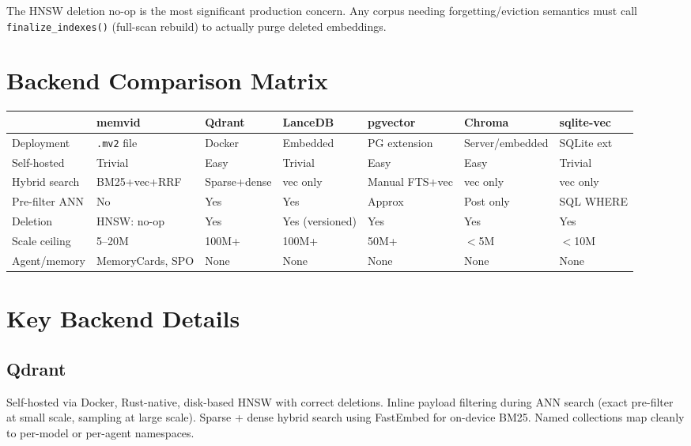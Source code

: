 The HNSW deletion no-op is the most significant production concern. Any corpus needing
forgetting/eviction semantics must call \texttt{finalize\_indexes()} (full-scan rebuild) to
actually purge deleted embeddings.

\section{Backend Comparison Matrix}

\begin{center}
\begin{tabular}{lllllll}
\toprule
& \textbf{memvid} & \textbf{Qdrant} & \textbf{LanceDB} & \textbf{pgvector} & \textbf{Chroma} & \textbf{sqlite-vec} \\
\midrule
Deployment & \texttt{.mv2} file & Docker & Embedded & PG extension & Server/embedded & SQLite ext \\
Self-hosted & Trivial & Easy & Trivial & Easy & Easy & Trivial \\
Hybrid search & BM25+vec+RRF & Sparse+dense & vec only & Manual FTS+vec & vec only & vec only \\
Pre-filter ANN & No & Yes & Yes & Approx & Post only & SQL WHERE \\
Deletion & HNSW: no-op & Yes & Yes (versioned) & Yes & Yes & Yes \\
Scale ceiling & 5--20M & 100M+ & 100M+ & 50M+ & $<$5M & $<$10M \\
Agent/memory & MemoryCards, SPO & None & None & None & None & None \\
\bottomrule
\end{tabular}
\end{center}

\section{Key Backend Details}

\subsection{Qdrant}

Self-hosted via Docker, Rust-native, disk-based HNSW with correct deletions. Inline payload
filtering during ANN search (exact pre-filter at small scale, sampling at large scale).
Sparse + dense hybrid search using FastEmbed for on-device BM25. Named collections map cleanly
to per-model or per-agent namespaces.

